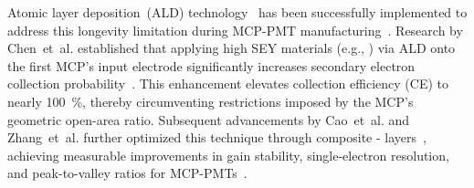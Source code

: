 Atomic layer deposition~(ALD) technology~\cite{2012An} has been successfully implemented to address this longevity limitation during MCP-PMT manufacturing~\cite{Lehmann:2022ret}. Research by Chen~et~al. established that applying high SEY materials (e.g., ) via ALD onto the first MCP's input electrode significantly increases secondary electron collection probability~\cite{2016Optimization}. This enhancement elevates collection efficiency (CE) to nearly \SI{100}{\%}, thereby circumventing restrictions imposed by the MCP's geometric open-area ratio. Subsequent advancements by Cao~et~al. and Zhang~et~al. further optimized this technique through composite - layers~\cite{cao_secondary_2021,zzj2021Al}, achieving measurable improvements in gain stability, single-electron resolution, and peak-to-valley ratios for MCP-PMTs~\cite{2021Effects}.

